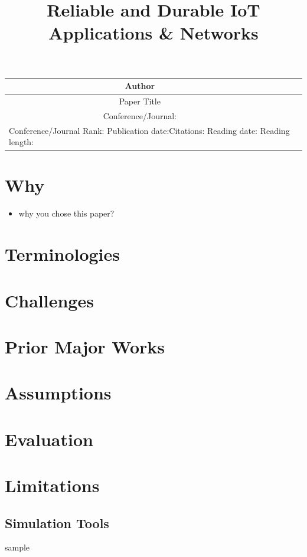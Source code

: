 \documentclass[a4paper,11pt]{article}
\title{ \vspace{-2cm} Reliable and Durable IoT Applications \& Networks \vspace{-5ex}}
\author{}
\date{}
\newcommand*\tick{\item[\Checkmark]}
\begin{document}
    \maketitle
    \thispagestyle{fancy}
    \begin{table}[h!]
        \centering
        \begin{tabularx}{\linewidth}{|c|X|}
            \hline
            Author \cellcolor{babyblueeyes} & \\ \hline
            Paper Title \cellcolor{babyblueeyes} & \\ \hline
            Conference/Journal: \cellcolor{babyblueeyes} & \\ \hline
            \multicolumn{2}{|l|}{Conference/Journal Rank: \quad Publication date:\quad Citations: \quad Reading date: \quad Reading length:}\\ \hline

        \end{tabularx}
    \end{table}
    
    \section{Why }\label{sec:why}
    \begin{itemize}
        \tick why you chose this paper?
    \end{itemize}
    
    \section{Terminologies}\label{sec:terminologies}
    \lipsum[1]
    \section{Challenges}\label{sec:challenges}
    \lipsum[1]
    \section{Prior Major Works}\label{sec:prior-major-works}
    \lipsum[1]
    \section{Assumptions}\label{sec:assumptions}
    \lipsum[1]
    \section{Evaluation}\label{sec:evaluation} 
    \lipsum[1]

    \section{Limitations}\label{sec:limitations}
    \lipsum[1]
    \subsection{Simulation Tools}

    sample\cite{keshav2007read}
    
    
\end{document}
